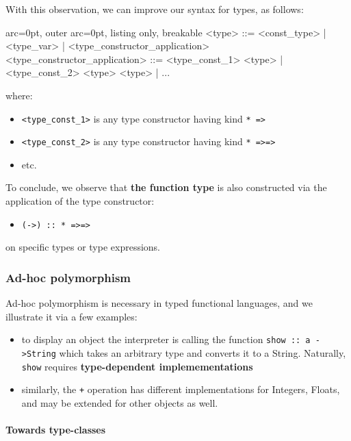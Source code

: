 With this observation, we can improve our syntax for types, as follows:


\begin{tcblisting}{ arc=0pt, outer arc=0pt, listing only, breakable}
<type> ::= <const_type> | <type_var> | <type_constructor_application>
<type_constructor_application> ::= <type_const_1> <type> | <type_const_2> <type> <type> | ...

\end{tcblisting}


where:
\begin{itemize}
	\item  \texttt{\textless type\_const\_1\textgreater } is any type constructor having kind \texttt{* =\textgreater  *}
	\item  \texttt{\textless type\_const\_2\textgreater } is any type constructor having kind \texttt{* =\textgreater  * =\textgreater  *}
	\item  etc.
\end{itemize}

To conclude, we observe that \textbf{the function type} is also constructed via the application of the type constructor:
\begin{itemize}
	\item  \texttt{(-\textgreater ) :: * =\textgreater  * =\textgreater  *}
\end{itemize}
on specific types or type expressions.


\subsubsection*{ Ad-hoc polymorphism }

Ad-hoc polymorphism is necessary in typed functional languages, and we illustrate it via a few examples:
\begin{itemize}
	\item  to display an object the interpreter is calling the function \texttt{show :: a -\textgreater  String} which takes an arbitrary type and converts it to a String. Naturally, \texttt{show} requires \textbf{type-dependent implemementations}
	\item  similarly, the \texttt{+} operation has different implementations for Integers, Floats, and may be extended for other objects as well.
\end{itemize}

\paragraph{ Towards type-classes }\hfill\\

